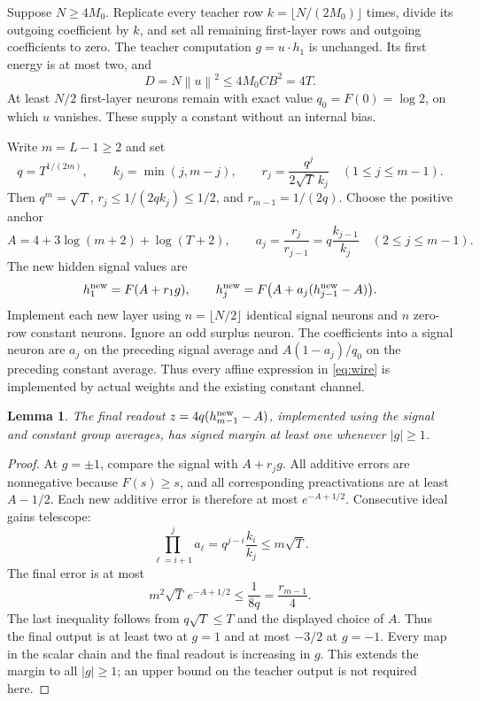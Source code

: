 \documentclass[11pt]{article}
\newtheorem{lemma}[theorem]{Lemma}
\theoremstyle{remark}\newtheorem{remark}[theorem]{Remark}
\newcommand{\norm}[1]{\left\lVert #1\right\rVert}
\begin{document}
Suppose $N\ge4M_0$. Replicate every teacher row
$k=\lfloor N/(2M_0)\rfloor$ times, divide its outgoing coefficient by
$k$, and set all remaining first-layer rows and outgoing coefficients
to zero. The teacher computation $g=u\cdot h_1$ is unchanged. Its
first energy is at most two, and
\[
 D=N\norm u^2\le4M_0CB^2=4T.
\]
At least $N/2$ first-layer neurons remain with exact value
$q_0=F(0)=\log2$, on which $u$ vanishes. These supply a constant without
an internal bias.

Write $m=L-1\ge2$ and set
\[
 q=T^{1/(2m)},\qquad k_j=\min(j,m-j),\qquad
 r_j=\frac{q^j}{2\sqrt T\,k_j}\quad(1\le j\le m-1).
\]
Then $q^m=\sqrt T$, $r_j\le1/(2qk_j)\le1/2$, and
$r_{m-1}=1/(2q)$. Choose the positive anchor
\[
 A=4+3\log(m+2)+\log(T+2),\qquad
 a_j=\frac{r_j}{r_{j-1}}=q\frac{k_{j-1}}{k_j}\quad(2\le j\le m-1).
\]
The new hidden signal values are
\begin{equation}\label{eq:wire}
 h_1^{\rm new}=F(A+r_1g),\qquad
 h_j^{\rm new}=F\bigl(A+a_j(h_{j-1}^{\rm new}-A)\bigr).
\end{equation}
Implement each new layer using $n=\lfloor N/2\rfloor$ identical signal
neurons and $n$ zero-row constant neurons. Ignore an odd surplus neuron.
The coefficients into a signal neuron are $a_j$ on the preceding signal
average and $A(1-a_j)/q_0$ on the preceding constant average.
Thus every affine expression in \eqref{eq:wire} is implemented by actual
weights and the existing constant channel.

\begin{lemma}\label{lem:margin}
The final readout $z=4q(h_{m-1}^{\rm new}-A)$, implemented using the
signal and constant group averages, has signed margin at least one
whenever $|g|\ge1$.
\end{lemma}
\begin{proof}
At $g=\pm1$, compare the signal with $A+r_jg$. All additive errors are
nonnegative because $F(s)\ge s$, and all corresponding preactivations
are at least $A-1/2$. Each new additive error is therefore at most
$e^{-A+1/2}$. Consecutive ideal gains telescope:
\[
 \prod_{\ell=i+1}^j a_\ell=q^{j-i}\frac{k_i}{k_j}\le m\sqrt T.
\]
The final error is at most
\[
 m^2\sqrt T\,e^{-A+1/2}\le\frac1{8q}=\frac{r_{m-1}}4.
\]
The last inequality follows from $q\sqrt T\le T$ and the displayed
choice of $A$. Thus the final output is at least two at $g=1$ and
at most $-3/2$ at $g=-1$. Every map in the scalar chain and the final
readout is increasing in $g$. This extends the margin to all $|g|\ge1$;
an upper bound on the teacher output is not required here.
\end{proof}
\end{document}
